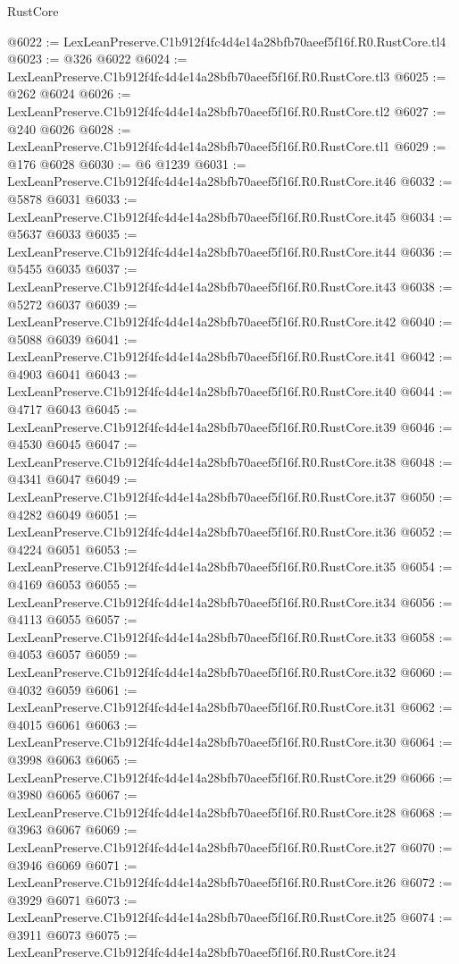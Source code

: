 \begin{lexlean}{RustCore}
\begin{coremodule}
@6022 := LexLeanPreserve.C1b912f4fc4d4e14a28bfb70aeef5f16f.R0.RustCore.tl4
@6023 := @326 @6022
@6024 := LexLeanPreserve.C1b912f4fc4d4e14a28bfb70aeef5f16f.R0.RustCore.tl3
@6025 := @262 @6024
@6026 := LexLeanPreserve.C1b912f4fc4d4e14a28bfb70aeef5f16f.R0.RustCore.tl2
@6027 := @240 @6026
@6028 := LexLeanPreserve.C1b912f4fc4d4e14a28bfb70aeef5f16f.R0.RustCore.tl1
@6029 := @176 @6028
@6030 := @6 @1239
@6031 := LexLeanPreserve.C1b912f4fc4d4e14a28bfb70aeef5f16f.R0.RustCore.it46
@6032 := @5878 @6031
@6033 := LexLeanPreserve.C1b912f4fc4d4e14a28bfb70aeef5f16f.R0.RustCore.it45
@6034 := @5637 @6033
@6035 := LexLeanPreserve.C1b912f4fc4d4e14a28bfb70aeef5f16f.R0.RustCore.it44
@6036 := @5455 @6035
@6037 := LexLeanPreserve.C1b912f4fc4d4e14a28bfb70aeef5f16f.R0.RustCore.it43
@6038 := @5272 @6037
@6039 := LexLeanPreserve.C1b912f4fc4d4e14a28bfb70aeef5f16f.R0.RustCore.it42
@6040 := @5088 @6039
@6041 := LexLeanPreserve.C1b912f4fc4d4e14a28bfb70aeef5f16f.R0.RustCore.it41
@6042 := @4903 @6041
@6043 := LexLeanPreserve.C1b912f4fc4d4e14a28bfb70aeef5f16f.R0.RustCore.it40
@6044 := @4717 @6043
@6045 := LexLeanPreserve.C1b912f4fc4d4e14a28bfb70aeef5f16f.R0.RustCore.it39
@6046 := @4530 @6045
@6047 := LexLeanPreserve.C1b912f4fc4d4e14a28bfb70aeef5f16f.R0.RustCore.it38
@6048 := @4341 @6047
@6049 := LexLeanPreserve.C1b912f4fc4d4e14a28bfb70aeef5f16f.R0.RustCore.it37
@6050 := @4282 @6049
@6051 := LexLeanPreserve.C1b912f4fc4d4e14a28bfb70aeef5f16f.R0.RustCore.it36
@6052 := @4224 @6051
@6053 := LexLeanPreserve.C1b912f4fc4d4e14a28bfb70aeef5f16f.R0.RustCore.it35
@6054 := @4169 @6053
@6055 := LexLeanPreserve.C1b912f4fc4d4e14a28bfb70aeef5f16f.R0.RustCore.it34
@6056 := @4113 @6055
@6057 := LexLeanPreserve.C1b912f4fc4d4e14a28bfb70aeef5f16f.R0.RustCore.it33
@6058 := @4053 @6057
@6059 := LexLeanPreserve.C1b912f4fc4d4e14a28bfb70aeef5f16f.R0.RustCore.it32
@6060 := @4032 @6059
@6061 := LexLeanPreserve.C1b912f4fc4d4e14a28bfb70aeef5f16f.R0.RustCore.it31
@6062 := @4015 @6061
@6063 := LexLeanPreserve.C1b912f4fc4d4e14a28bfb70aeef5f16f.R0.RustCore.it30
@6064 := @3998 @6063
@6065 := LexLeanPreserve.C1b912f4fc4d4e14a28bfb70aeef5f16f.R0.RustCore.it29
@6066 := @3980 @6065
@6067 := LexLeanPreserve.C1b912f4fc4d4e14a28bfb70aeef5f16f.R0.RustCore.it28
@6068 := @3963 @6067
@6069 := LexLeanPreserve.C1b912f4fc4d4e14a28bfb70aeef5f16f.R0.RustCore.it27
@6070 := @3946 @6069
@6071 := LexLeanPreserve.C1b912f4fc4d4e14a28bfb70aeef5f16f.R0.RustCore.it26
@6072 := @3929 @6071
@6073 := LexLeanPreserve.C1b912f4fc4d4e14a28bfb70aeef5f16f.R0.RustCore.it25
@6074 := @3911 @6073
@6075 := LexLeanPreserve.C1b912f4fc4d4e14a28bfb70aeef5f16f.R0.RustCore.it24

\end{coremodule}
\end{lexlean}
